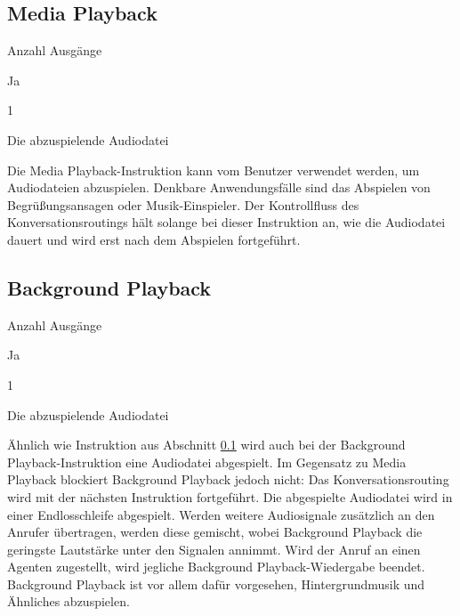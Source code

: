 \subsection{Media Playback}
\label{subsec:Media Playback}
\begin{labeling}{Anzahl Ausgänge}
\item [Eingang] Ja
\item [Anzahl Ausgänge] 1
\item [Parameter] Die abzuspielende Audiodatei
\item [Beschreibung] Die Media Playback-Instruktion kann vom Benutzer verwendet werden, um Audiodateien abzuspielen. Denkbare Anwendungsfälle sind das Abspielen von Begrüßungsansagen oder Musik-Einspieler. Der Kontrollfluss des Konversationsroutings hält solange bei dieser Instruktion an, wie die Audiodatei dauert und wird erst nach dem Abspielen fortgeführt.
\end{labeling}

\subsection{Background Playback}
\begin{labeling}{Anzahl Ausgänge}
\item [Eingang] Ja
\item [Anzahl Ausgänge] 1
\item [Parameter] Die abzuspielende Audiodatei
\item [Beschreibung] Ähnlich wie Instruktion aus Abschnitt \ref{subsec:Media Playback} wird auch bei der Background Playback-Instruktion eine Audiodatei abgespielt. Im Gegensatz zu Media Playback blockiert Background Playback jedoch nicht: Das Konversationsrouting wird mit der nächsten Instruktion fortgeführt. Die abgespielte Audiodatei wird in einer Endlosschleife abgespielt. Werden weitere Audiosignale zusätzlich an den Anrufer übertragen, werden diese gemischt, wobei Background Playback die geringste Lautstärke unter den Signalen annimmt. Wird der Anruf an einen Agenten zugestellt, wird jegliche Background Playback-Wiedergabe beendet. Background Playback ist vor allem dafür vorgesehen, Hintergrundmusik und Ähnliches abzuspielen.
\end{labeling}

